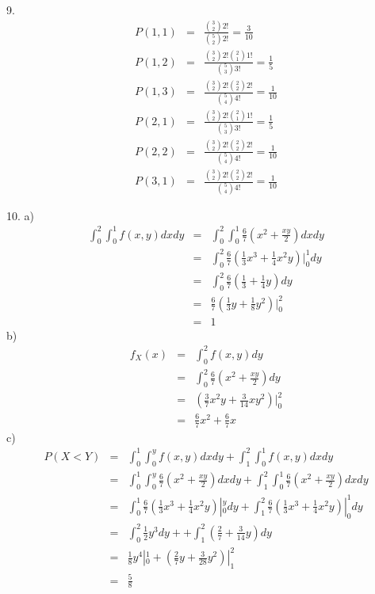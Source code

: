 \documentclass[12pt]{article}
\begin{document}
9.
\begin{eqnarray*}
  P(1,1)
  &=& \frac {{3 \choose 2}2!}{{5 \choose 2}2!}
  = \frac {3}{10} \\
  P(1,2)
  &=& \frac {{3 \choose 2} 2! {2 \choose 1} 1!} {{5 \choose 3} 3!}
  = \frac {1}{5} \\
  P(1,3)
  &=& \frac {{3 \choose 2} 2! {2 \choose 2} 2!} {{5 \choose 4} 4!}
  = \frac {1}{10} \\
  P(2,1)
  &=& \frac {{3 \choose 2} 2! {2 \choose 1} 1!} {{5 \choose 3} 3!}
  = \frac {1}{5} \\
  P(2,2)
  &=& \frac {{3 \choose 2} 2! {2 \choose 2} 2!} {{5 \choose 4} 4!}
  = \frac {1}{10} \\
  P(3,1)
  &=& \frac {{3 \choose 2} 2! {2 \choose 2} 2!} {{5 \choose 4} 4!}
  = \frac {1}{10}
\end{eqnarray*}

10.
a)
\begin{eqnarray*}
  \int_{0}^{2} \int_{0}^{1} f(x,y) dx dy
  &=& \int_{0}^{2} \int_{0}^{1} \frac {6}{7} (x^2 + \frac {xy}{2}) dx dy \\
  &=& \int_{0}^{2} \frac {6}{7} 
  (\frac{1}{3} x^3 + \frac {1}{4} x^2y)|_0^1 dy \\
  &=& \int_{0}^{2} \frac {6}{7} (\frac{1}{3} + \frac {1}{4} y) dy \\
  &=& \frac {6}{7} (\frac{1}{3} y + \frac {1}{8} y^2)|_0^2 \\
  &=& 1
\end{eqnarray*}
b)
\begin{eqnarray*}
  f_X(x)
  &=& \int_{0}^{2} f(x,y) dy \\
  &=& \int_{0}^{2} \frac {6}{7} (x^2 + \frac {xy}{2}) dy \\
  &=& (\frac {3}{7} x^2y + \frac {3}{14} xy^2)|_0^2 \\
  &=& \frac {6}{7} x^2 + \frac {6}{7} x
\end{eqnarray*}
c)
\begin{eqnarray*}
P(X < Y)
&=& \int_{0}^{1} \int_{0}^{y} f(x,y) dx dy 
+ \int_{1}^{2} \int_{0}^{1} f(x,y) dx dy \\
&=& \int_{0}^{1} \int_{0}^{y} \frac {6}{7} (x^2 + \frac {xy}{2}) dx dy
+  \int_{1}^{2} \int_{0}^{1} \frac {6}{7} (x^2 + \frac {xy}{2}) dx dy \\
&=& \int_{0}^{1} \frac {6}{7} (\frac{1}{3} x^3 + \frac {1}{4} x^2y)|_0^y dy
+ \int_{1}^{2} \frac{6}{7} (\frac{1}{3} x^3 + \frac {1}{4} x^2y)|_0^1 dy \\
&=& \int_{0}^{2} \frac{1}{2} y^3 dy + 
+ \int_{1}^{2} (\frac{2}{7} + \frac {3}{14} y) dy \\
&=& \frac{1}{8} y^4|_0^1 + (\frac{2}{7} y + \frac {3}{28} y^2)|_1^2 \\
&=& \frac {5}{8}
\end{eqnarray*}
\end{document}
